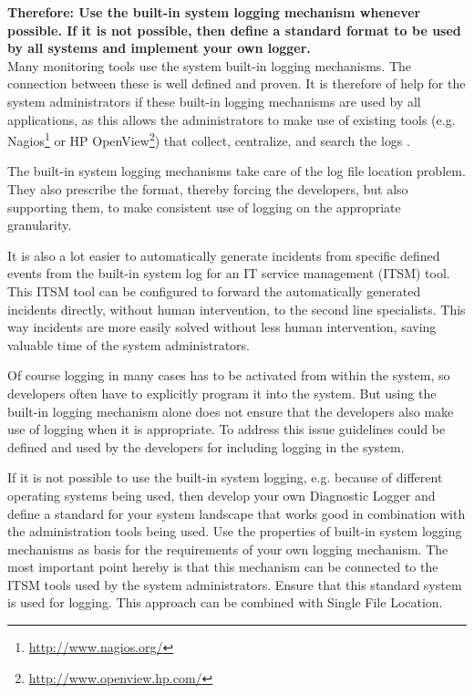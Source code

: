 \textbf{Therefore:
Use the built-in system logging mechanism whenever possible.
If it is not possible, then define a standard format to be used by all systems 
and implement your own logger.}\\

Many monitoring tools use the system built-in logging mechanisms. The connection between these is well defined and proven. It is therefore of help for the system administrators if these built-in logging mechanisms are used by all applications, as this allows the administrators to make use of existing tools (e.g. Nagios\footnote{\url{http://www.nagios.org/}} or HP OpenView\footnote{\url{http://www.openview.hp.com/}}) that collect, centralize, and search the logs \cite{Limoncelli2011a}.

The built-in system logging mechanisms take care of the log file location problem. They also prescribe the format, thereby forcing the developers, but also supporting them, to make consistent use of logging on the appropriate granularity.

It is also a lot easier to automatically generate incidents from specific defined events from the built-in system log for an IT service management (ITSM) tool. This ITSM tool can be configured to forward the automatically generated incidents directly, without human intervention, to the second line specialists. This way incidents are more easily solved without less human intervention, saving valuable time of the system administrators.

Of course logging in many cases has to be activated from within the system, so developers often have to explicitly program it into the system. But using the built-in logging mechanism alone does not ensure that the developers also make use of logging when it is appropriate. To address this issue guidelines could be defined and used by the developers for including logging in the system. 


If it is not possible to use the built-in system logging, e.g. because of different operating systems being used, then develop your own {\sc Diagnostic Logger} \cite{Harrison2011} and define a standard for your system landscape that works good in combination with the administration tools being used. Use the properties of built-in system logging mechanisms as basis for the requirements of your own logging mechanism. The most important point hereby is that this mechanism can be connected to the ITSM tools used by the system administrators. Ensure that this standard system is used for logging. This approach can be combined with {\sc Single File Location}.

